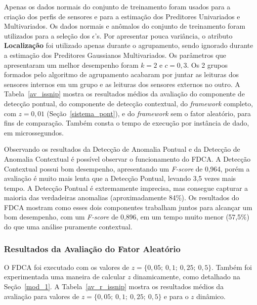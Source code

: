 \documentclass[cic,tc]{iiufrgs}
\begin{document}
Apenas os dados normais do conjunto de treinamento foram usados para a criação dos perfis de sensores e para a estimação dos Preditores Univariados e Multivariados. Os dados normais e anômalos do conjunto de treinamento foram utilizados para a seleção dos $\epsilon$'s. Por apresentar pouca variância, o atributo \textbf{Localização} foi utilizado apenas durante o agrupamento, sendo ignorado durante a estimação dos Preditores Gaussianos Multivariados. Os parâmetros que apresentaram um melhor desempenho foram $k = 2$ e $c = 0,3$. Os 2 grupos formados pelo algoritmo de agrupamento acabaram por juntar as leituras dos sensores internos em um grupo e as leituras dos sensores externos no outro. A Tabela~\ref{av_issnip} mostra os resultados médios da avaliação do componente de detecção pontual, do componente de detecção contextual, do \textit{framework} completo, com $z = 0,01$ (Seção~\ref{sistema_pont}), e do \textit{framework} sem o fator aleatório, para fins de comparação. Também consta o tempo de execução por instância de dado, em microssegundos.

Observando os resultados da Detecção de Anomalia Pontual e da Detecção de Anomalia Contextual é possível observar o funcionamento do FDCA. A Detecção Contextual possui bom desempenho, apresentando um \textit{F-score} de 0,964, porém a avaliação é muito mais lenta que a Detecção Pontual, levando 3,5 vezes mais tempo. A Detecção Pontual é extremamente imprecisa, mas consegue capturar a maioria das verdadeiras anomalias (aproximadamente 84\%). Os resultados do FDCA mostram como esses dois componentes trabalham juntos para alcançar um bom desempenho, com um \textit{F-score} de 0,896, em um tempo muito menor (57,5\%) do que uma análise puramente contextual.

\subsubsection{Resultados da Avaliação do Fator Aleatório}
\label{issnip_FA}
O FDCA foi executado com os valores de $z =\{0,05;~0,1;~0,25;~0,5\}$. Também foi experimentada uma maneira de calcular $z$ dinamicamente, como detalhado na Seção~\ref{mod_1}. A Tabela~\ref{av_r_issnip} mostra os resultados médios da avaliação para valores de $z = \{0,05;~0,1;~0,25;~0,5\}$ e para o $z$ dinâmico.
\end{document}
